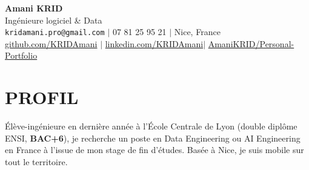 

\begin{center}
    {\Huge\bfseries Amani KRID} \\ \vspace{5pt}
    {\large\color{dark-grey} Ingénieure logiciel \& Data} \\ \vspace{7pt}
    \small
    \texttt{kridamani.pro@gmail.com} \hspace{3pt}$|$\hspace{3pt}
    07 81 25 95 21 \hspace{3pt}$|$\hspace{3pt}
    Nice, France \\ \vspace{3pt}
    \href{https://github.com/KRIDAmani}{github.com/KRIDAmani} \hspace{3pt}$|$\hspace{3pt}
    \href{https://www.linkedin.com/in/amani-krid-63aa3723a}{linkedin.com/KRIDAmani}\hspace{3pt}$|$\hspace{3pt}
    \href{https://kridamani.github.io/Personal-Portfolio/}{AmaniKRID/Personal-Portfolio} \hspace{3pt}
    
\end{center}

\section{PROFIL}
Élève-ingénieure en dernière année à l'École Centrale de Lyon (double diplôme ENSI, \textbf{BAC+6}), je recherche un poste en Data Engineering ou AI Engineering en France à l'issue de mon stage de fin d'études. Basée à Nice, je suis mobile sur tout le territoire.

